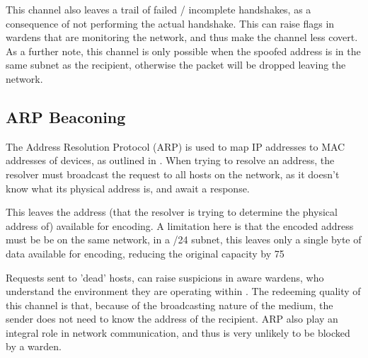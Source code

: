 This channel also leaves a trail of failed / incomplete handshakes, as a consequence of not performing the actual handshake. This can raise flags in wardens that are monitoring the network, and thus make the channel less covert. As a further note, this channel is only possible when the spoofed address is in the same subnet as the recipient, otherwise the packet will be dropped leaving the network. 

\subsection{ARP Beaconing}

The Address Resolution Protocol (ARP) is used to map IP addresses to MAC addresses of devices, as outlined in \cite{Arfc826}. When trying to resolve an address, the resolver must broadcast the request to all hosts on the network, as it doesn't know what its physical address is, and await a response.

This leaves the address (that the resolver is trying to determine the physical address of) available for encoding. A limitation here is that the encoded address must be be on the same network, in a /24 subnet, this leaves only a single byte of data available for encoding, reducing the original capacity by 75%

Requests sent to 'dead' hosts, can raise suspicions in aware wardens, who understand the environment they are operating within \cite{CCUARP}. The redeeming quality of this channel is that, because of the broadcasting nature of the medium, the sender does not need to know the address of the recipient. ARP also play an integral role in network communication, and thus is very unlikely to be blocked by a warden.
